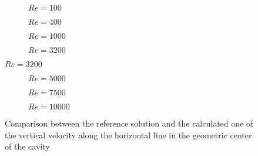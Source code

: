 \begin{figure}[h]
	\centering
	\begin{subfigure}{0.5\textwidth}
		\resizebox{1.4\textwidth}{!}{}
		\caption{$Re=100$}
	\end{subfigure}%
	\begin{subfigure}{0.5\textwidth}
		\resizebox{1.4\textwidth}{!}{}
		\caption{$Re=400$}
	\end{subfigure}
	\begin{subfigure}{0.5\textwidth}
		\resizebox{1.4\textwidth}{!}{}
		\caption{$Re=1000$}
	\end{subfigure}%
	\begin{subfigure}{0.5\textwidth}
		\resizebox{1.4\textwidth}{!}{}
		\caption{$Re=3200$}
	\end{subfigure}
\end{figure}
\begin{figure}\ContinuedFloat
	\begin{subfigure}{0.5\textwidth}
		\resizebox{1.4\textwidth}{!}{}
		\caption{$Re=5000$}
	\end{subfigure}%
	\begin{subfigure}{0.5\textwidth}
		\resizebox{1.4\textwidth}{!}{}
		\caption{$Re=7500$}
	\end{subfigure}
	\begin{subfigure}{0.5\textwidth}
		\center
		\resizebox{1.4\textwidth}{!}{}
		\caption{$Re=10000$}
	\end{subfigure}
	\caption[Comparison between the reference solution and the calculated one of the vertical velocity along the horizontal line in the geometric center of the cavity]{Comparison between the reference solution and the calculated one of the vertical velocity along the horizontal line in the geometric center of the cavity \cite{Ghia1982}}
	\label{Drivenvertical}
\end{figure}